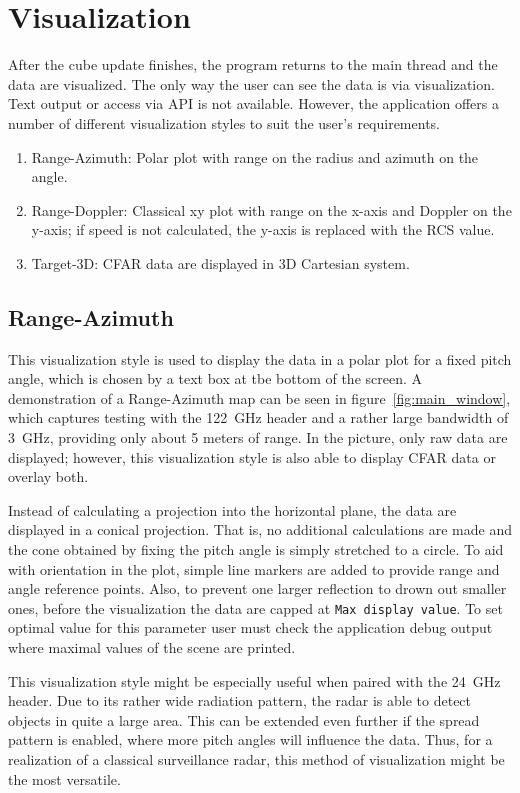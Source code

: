 \section{Visualization}

After the cube update finishes, the program returns to the main thread and the data are visualized.
The only way the user can see the data is via visualization.
Text output or access via API is not available.
However, the application offers a number of different visualization styles to suit the user's requirements.

\begin{enumerate}
	\item Range-Azimuth: Polar plot with range on the radius and azimuth on the angle.
	\item Range-Doppler: Classical xy plot with range on the x-axis and Doppler on the y-axis; if speed is not calculated, the y-axis is replaced with the RCS value.
	\item Target-3D: CFAR data are displayed in 3D Cartesian system.
\end{enumerate}

\subsection{Range-Azimuth}

This visualization style is used to display the data in a polar plot for a fixed pitch angle, which is chosen by a text box at tbe bottom of the screen.
A demonstration of a Range-Azimuth map can be seen in figure~\ref{fig:main_window}, which captures testing with the 122~GHz header and a rather large bandwidth of 3~GHz, providing only about 5 meters of range.
In the picture, only raw data are displayed; however, this visualization style is also able to display CFAR data or overlay both.

Instead of calculating a projection into the horizontal plane, the data are displayed in a conical projection.
That is, no additional calculations are made and the cone obtained by fixing the pitch angle is simply stretched to a circle.
To aid with orientation in the plot, simple line markers are added to provide range and angle reference points.
Also, to prevent one larger reflection to drown out smaller ones, before the visualization the data are capped at \texttt{Max display value}.
To set optimal value for this parameter user must check the application debug output  where maximal values of the scene are printed.

This visualization style might be especially useful when paired with the 24~GHz header.
Due to its rather wide radiation pattern, the radar is able to detect objects in quite a large area.
This can be extended even further if the spread pattern is enabled, where more pitch angles will influence the data.
Thus, for a realization of a classical surveillance radar, this method of visualization might be the most versatile.

